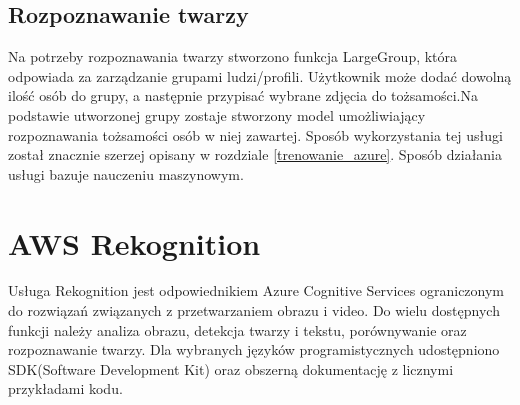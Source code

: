\subsection{Rozpoznawanie twarzy}
Na potrzeby rozpoznawania twarzy stworzono funkcja LargeGroup, która odpowiada za zarządzanie grupami ludzi/profili. Użytkownik może dodać dowolną ilość osób do grupy, a następnie przypisać wybrane zdjęcia do tożsamości.Na podstawie utworzonej grupy zostaje stworzony model umożliwiający rozpoznawania tożsamości osób w niej zawartej. Sposób wykorzystania tej usługi został znacznie szerzej opisany w rozdziale \ref{trenowanie_azure}. Sposób działania usługi bazuje nauczeniu maszynowym.

\section{AWS Rekognition}
Usługa Rekognition jest odpowiednikiem Azure Cognitive Services ograniczonym do rozwiązań związanych z przetwarzaniem obrazu i video. Do wielu dostępnych funkcji należy analiza obrazu, detekcja twarzy i tekstu, porównywanie oraz rozpoznawanie twarzy. Dla wybranych języków programistycznych udostępniono SDK(Software Development Kit) oraz obszerną dokumentację z licznymi przykładami kodu.
